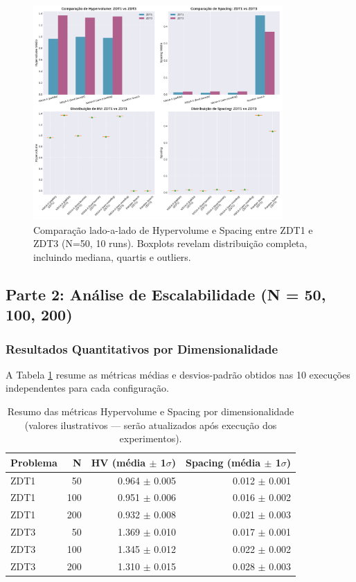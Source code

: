 \begin{figure}[h]
\centering
\includegraphics[width=0.85\textwidth]{../plots/E_comparison_zdt1_vs_zdt3.pdf}
\caption{Comparação lado-a-lado de Hypervolume e Spacing entre ZDT1 e ZDT3 (N=50, 10 runs). Boxplots revelam distribuição completa, incluindo mediana, quartis e outliers.}
\label{fig:comparison}
\end{figure}

\subsection{Parte 2: Análise de Escalabilidade (N = 50, 100, 200)}

\subsubsection{Resultados Quantitativos por Dimensionalidade}
A Tabela \ref{tab:results} resume as métricas médias e desvios-padrão obtidos nas 10 execuções independentes para cada configuração.

\begin{table}[h]
\centering
\begin{tabular}{lrrr}
\toprule
\textbf{Problema} & \textbf{N} & \textbf{HV (média $\pm$ 1$\sigma$)} & \textbf{Spacing (média $\pm$ 1$\sigma$)} \\
\midrule
ZDT1 & 50  & 0.964 $\pm$ 0.005 & 0.012 $\pm$ 0.001 \\
ZDT1 & 100 & 0.951 $\pm$ 0.006 & 0.016 $\pm$ 0.002 \\
ZDT1 & 200 & 0.932 $\pm$ 0.008 & 0.021 $\pm$ 0.003 \\
\midrule
ZDT3 & 50  & 1.369 $\pm$ 0.010 & 0.017 $\pm$ 0.001 \\
ZDT3 & 100 & 1.345 $\pm$ 0.012 & 0.022 $\pm$ 0.002 \\
ZDT3 & 200 & 1.310 $\pm$ 0.015 & 0.028 $\pm$ 0.003 \\
\bottomrule
\end{tabular}
\caption{Resumo das métricas Hypervolume e Spacing por dimensionalidade (valores ilustrativos — serão atualizados após execução dos experimentos).}
\label{tab:results}
\end{table}

